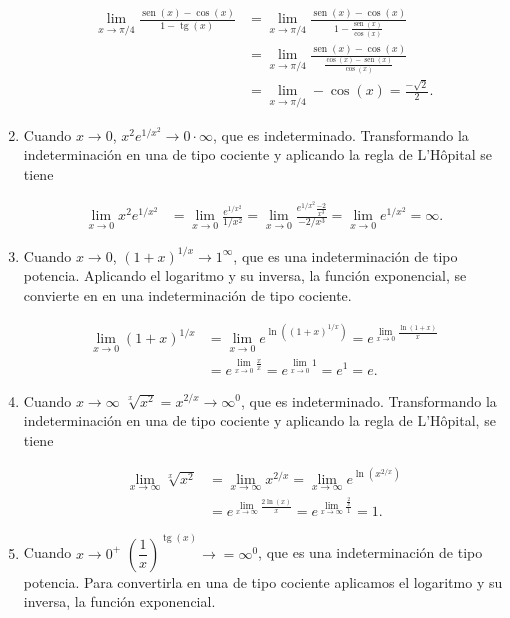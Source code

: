 \documentclass[
  a4paper,
]{scrreport}
\theoremstyle{definition}
\theoremstyle{remark}
\begin{document}
\begin{tcolorbox}
\begin{enumerate}
  \begin{align*}
  \lim_{x\to \pi/4}\frac{\operatorname{sen}(x)-\cos(x)}{1-\operatorname{tg}(x)} &= \lim_{x\to \pi/4}\frac{\operatorname{sen}(x)-\cos(x)}{1-\frac{\operatorname{sen}(x)}{\cos(x)}}\\ 
  & = \lim_{x\to \pi/4}\frac{\operatorname{sen}(x)-\cos(x)}{\frac{\cos(x)-\operatorname{sen}(x)}{\cos(x)}}\\ 
  & = \lim_{x\to \pi/4} -\cos(x) = \frac{-\sqrt{2}}{2}.
  \end{align*}
\item
  Cuando \(x\to 0\), \(x^2e^{1/x^2}\to 0\cdot \infty\), que es
  indeterminado. Transformando la indeterminación en una de tipo
  cociente y aplicando la regla de L'Hôpital se tiene

  \begin{align*}
  \lim_{x\to 0}x^2e^{1/x^2} &= \lim_{x\to 0}\frac{e^{1/x^2}}{1/x^2} = \lim_{x\to 0}\frac{e^{1/x^2}\frac{-2}{x^3}}{-2/x^3} = \lim_{x\to 0} e^{1/x^2} =\infty.
  \end{align*}
\item
  Cuando \(x\to 0\), \(\left(1+x\right)^{1/x}\to 1^\infty\), que es una
  indeterminación de tipo potencia. Aplicando el logaritmo y su inversa,
  la función exponencial, se convierte en en una indeterminación de tipo
  cociente.

  \begin{align*}
  \lim_{x\to 0}\left(1+x\right)^{1/x} 
  &= \lim_{x\to 0}e^{\ln(\left(1+x\right)^{1/x})}
  = e^{\lim_{x\to 0}\frac{\ln(1+x)}{x}} \tag{$\ln(1+x)\approx x$}\\  
  &= e^{\lim_{x\to 0}\frac{x}{x}} 
  = e^{\lim_{x\to 0}1} 
  = e^1 
  = e.
  \end{align*}
\item
  Cuando \(x\to\infty\) \(\sqrt[x]{x^2}=x^{2/x}\to \infty^0\), que es
  indeterminado. Transformando la indeterminación en una de tipo
  cociente y aplicando la regla de L'Hôpital, se tiene

  \begin{align*}
  \lim_{x\to \infty} \sqrt[x]{x^2} 
  &= \lim_{x\to \infty} x^{2/x} = \lim_{x\to \infty} e^{\ln(x^{2/x})}\\
  & = e^{\lim_{x\to \infty} \frac{2\ln(x)}{x}} = e^{\lim_{x\to \infty} \frac{\frac{2}{x}}{1}} = 1.
  \end{align*}
\item
  Cuando \(x\to 0^+\)
  \(\left(\dfrac{1}{x}\right)^{\operatorname{tg}(x)} \to = \infty^0\),
  que es una indeterminación de tipo potencia. Para convertirla en una
  de tipo cociente aplicamos el logaritmo y su inversa, la función
  exponencial.


\end{enumerate}
\end{tcolorbox}
\end{document}
